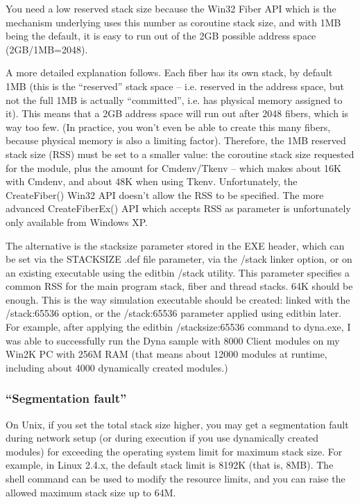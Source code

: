 You need a low reserved stack size because the Win32 Fiber API
which is the mechanism underlying  uses
this number as coroutine stack size, and with 1MB being the default,
it is easy to run out of the 2GB possible address space (2GB/1MB=2048).

A more detailed explanation follows.
Each fiber has its own stack, by default 1MB (this is the ``reserved''
stack space -- i.e. reserved in the address space, but not the full
1MB is actually ``committed'', i.e. has physical memory assigned to it).
This means that a 2GB address space will run out after 2048 fibers,
which is way too few. (In practice, you won't even be able to create
this many fibers, because physical memory is also a limiting factor).
Therefore, the 1MB reserved stack size (RSS) must be set to a smaller
value: the coroutine stack size requested for the module, plus
the  amount for Cmdenv/Tkenv -- which makes
about 16K with Cmdenv, and about 48K when using Tkenv.
Unfortunately, the CreateFiber() Win32 API doesn't allow the RSS to be
specified. The more advanced CreateFiberEx() API which accepts RSS as
parameter is unfortunately only available from Windows XP.

The alternative is the stacksize parameter stored in the EXE header,
which can be set
via the STACKSIZE .def file parameter, via the /stack linker option,
or on an existing executable using the editbin /stack utility.
This parameter specifies a common RSS for the main program stack,
fiber and thread stacks. 64K should be enough. This is the way
simulation executable should be created: linked with the /stack:65536
option, or the /stack:65536 parameter applied using editbin later.
For example, after applying the editbin /stacksize:65536 command to
dyna.exe, I was able to successfully run the Dyna sample with 8000
Client modules on my Win2K PC with 256M RAM (that means about 12000
modules at runtime, including about 4000 dynamically created modules.)


\subsubsection{``Segmentation fault''}

On Unix, if you set the total stack size higher, you may get a
segmentation fault during network setup (or
during execution if you use dynamically created modules) for exceeding
the operating system limit for maximum stack size. For example, in
Linux 2.4.x, the default stack limit is 8192K (that is, 8MB). The
 shell command can be used to modify the
resource limits, and you can raise the allowed maximum stack size
up to 64M.

